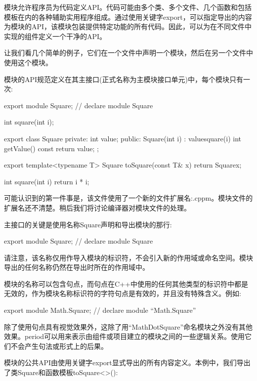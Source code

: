 
模块允许程序员为代码定义API。代码可能由多个类、多个文件、几个函数和包括模板在内的各种辅助实用程序组成。通过使用关键字export，可以指定导出的内容为模块的API，该模块包装提供特定功能的所有代码。因此，可以为在不同文件中实现的组件定义一个干净的API。

让我们看几个简单的例子，它们在一个文件中声明一个模块，然后在另一个文件中使用这个模块。


模块的API规范定义在其主接口(正式名称为主模块接口单元)中，每个模块只有一次:


\begin{cpp}
export module Square; // declare module Square

int square(int i);

export class Square {
private:
	int value;
public:
	Square(int i)
	: value{square(i)} {
	}
	int getValue() const {
		return value;
	}
};
	
export template<typename T>
Square toSquare(const T& x) {
	return Square{x};
}
	
int square(int i) {
	return i * i;
}
\end{cpp}

可能认识到的第一件事是，该文件使用了一个新的文件扩展名:.cppm。模块文件的扩展名还不清楚。稍后我们将讨论编译器对模块文件的处理。

主接口的关键是使用名称Square声明和导出模块的那行:

\begin{cpp}
export module Square; // declare module Square
\end{cpp}

请注意，该名称仅用作导入模块的标识符，不会引入新的作用域或命名空间。模块导出的任何名称仍然在导出时所在的作用域中。

模块的名称可以包含句点，而句点在C++中使用的任何其他类型的标识符中都是无效的，作为模块名称标识符的字符句点是有效的，并且没有特殊含义。例如:

\begin{cpp}
export module Math.Square; // declare module “Math.Square”
\end{cpp}

除了使用句点具有视觉效果外，这除了用“MathDotSquare”命名模块之外没有其他效果。period可以用来表示由组件或项目建立的模块之间的一些逻辑关系。使用它们不会产生句法或形式上的后果。

模块的公共API由使用关键字export显式导出的所有内容定义。本例中，我们导出了类Square和函数模板toSquare<>():

